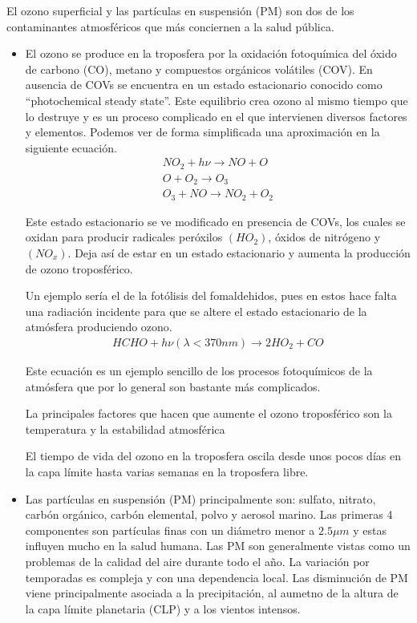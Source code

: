 \documentclass[12pt]{article}
\begin{document}
El ozono superficial y las partículas en suspensión (PM) son dos de los contaminantes atmosféricos que más conciernen a la salud pública.
\begin{itemize}
\item El ozono se produce en la  troposfera por la oxidación fotoquímica del óxido de carbono (CO), metano y compuestos orgánicos volátiles (COV). En ausencia de COVs se  encuentra en un estado estacionario conocido como ``photochemical steady state''. Este equilibrio  crea ozono al mismo tiempo que lo destruye y es un proceso complicado en el que intervienen diversos factores y elementos. Podemos ver  de forma simplificada una aproximación en la siguiente ecuación. 
\begin{eqnarray}
NO_2 + h\nu \rightarrow NO + O \nonumber \\
O + O_2 \rightarrow O_3 \nonumber \\
O_3 + NO \rightarrow NO_2  + O_2 \nonumber 
\end{eqnarray}

Este estado estacionario  se ve modificado en presencia de COVs, los cuales se oxidan para producir radicales peróxilos $(HO_2)$, óxidos de nitrógeno y $(NO_x)$. Deja así de estar en un estado estacionario y aumenta la  producción de ozono troposférico.

 Un ejemplo sería el de la fotólisis del fomaldehidos, pues en estos hace falta una radiación incidente para que se altere el estado estacionario de la atmósfera produciendo ozono.
\begin{eqnarray}
HCHO + h\nu (\lambda < 370nm) \rightarrow 2HO_2 + CO
\end{eqnarray}

Este ecuación es un ejemplo sencillo de los procesos fotoquímicos  de la atmósfera  que  por lo general son bastante más complicados. 


La principales factores que hacen que aumente el ozono troposférico son la temperatura y la estabilidad atmosférica \citep{ordonez2005}



El tiempo de vida del ozono en la troposfera oscila desde unos pocos días en la capa límite hasta varias semanas en la troposfera libre. 

\item Las partículas en suspensión (PM) principalmente son: sulfato, nitrato, carbón orgánico, carbón elemental, polvo y aerosol marino. Las primeras 4 componentes son partículas finas con un diámetro menor a $2.5\mu m$ y estas  influyen mucho en  la salud humana. Las PM son generalmente vistas como un problemas de la  calidad del aire durante todo el año.  La variación por temporadas es compleja y con una dependencia local. Las  disminución de PM  viene principalmente asociada a la precipitación, al aumetno de la altura de la capa límite planetaria (CLP) y a los vientos intensos.
\end{itemize}
\end{document}
